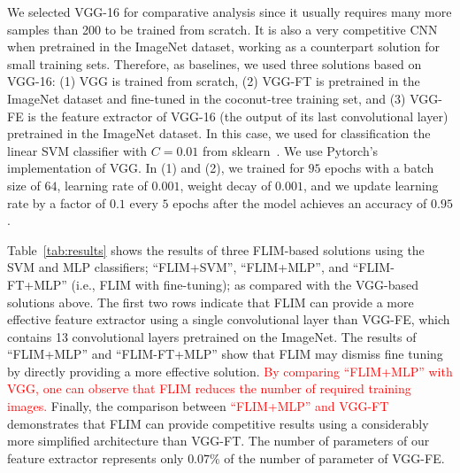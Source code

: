\documentclass[journal, twoside]{IEEEtran}
\begin{document}
{We selected VGG-16 for comparative analysis since it usually requires many more samples than 200 to be trained from scratch. It is also a very competitive CNN when pretrained in the ImageNet dataset, working as a counterpart solution for small training sets. Therefore, as baselines, we used three solutions based on VGG-16: (1) VGG is trained from scratch, (2) VGG-FT is pretrained in the ImageNet dataset and fine-tuned in the coconut-tree training set, and (3) VGG-FE is the feature extractor of VGG-16 (the output of its last convolutional layer) pretrained in the ImageNet dataset. In this case, we used for classification the  linear SVM classifier with $C=0.01$ from sklearn~\cite{fan2008liblinear, scikit-learn}. We use Pytorch's implementation of VGG. In (1) and (2), we trained for $95$ epochs with a batch size of $64$, learning rate of $0.001$, weight decay of $0.001$, and we update learning rate by a factor of $0.1$ every $5$ epochs after the model achieves an accuracy of $0.95$.

Table~\ref{tab:results} shows the results of three FLIM-based solutions using the SVM and MLP classifiers; ``FLIM+SVM'', ``FLIM+MLP'', and ``FLIM-FT+MLP'' (i.e., FLIM with fine-tuning); as compared with the VGG-based solutions above. The first two rows indicate that FLIM  can provide a more effective feature extractor using a single convolutional layer than VGG-FE, which contains 13 convolutional layers pretrained on the ImageNet. The results of ``FLIM+MLP'' and ``FLIM-FT+MLP'' show that FLIM  may dismiss fine tuning by directly providing a more effective solution. \textcolor{red}{By comparing ``FLIM+MLP'' with VGG, one can observe that FLIM reduces the number of required training images.} Finally, the comparison between \textcolor{red}{``FLIM+MLP'' and VGG-FT} demonstrates that FLIM can provide competitive results using a considerably more simplified architecture than  VGG-FT. The number of parameters of our feature extractor represents only $0.07\%$ of the number of parameter of VGG-FE.

}
\end{document}
